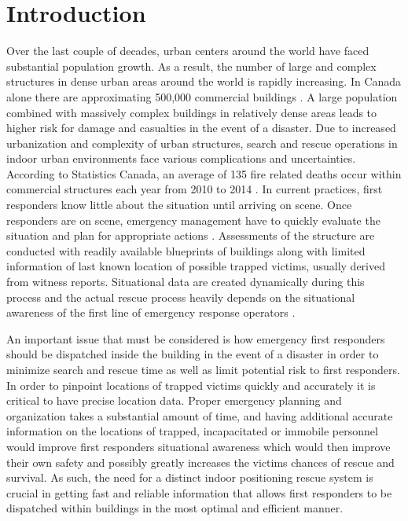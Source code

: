

\setcounter{section}{0}
\section{Introduction}
\bigskip
Over the last couple of decades, urban centers around the world have faced substantial population growth. As a result, the number of large and complex structures in dense urban areas around the world is rapidly increasing. In Canada alone there are approximating 500,000 commercial buildings \cite{R1-1}. A large population combined with massively complex buildings in relatively dense areas leads to higher risk for damage and casualties in the event of a disaster. Due to increased urbanization and complexity of urban structures, search and rescue operations in indoor urban environments face various complications and uncertainties. According to Statistics Canada, an average of 135 fire related deaths occur within commercial structures each year from 2010 to 2014 \cite{R1-2}. In current practices, first responders know little about the situation until arriving on scene. Once responders are on scene, emergency management have to quickly evaluate the situation and plan for appropriate actions \cite{R1-3}.  Assessments of the structure are conducted with readily available blueprints of buildings along with limited information of last known location of possible trapped victims, usually derived from witness reports. Situational data are created dynamically during this process and the actual rescue process heavily depends on the situational awareness of the first line of emergency response operators \cite{R1-4}.

\bigskip
An important issue that must be considered is how emergency first responders should be dispatched inside the building in the event of a disaster in order to minimize search and rescue time as well as limit potential risk to first responders. In order to pinpoint locations of trapped victims quickly and accurately it is critical to have precise location data. Proper emergency planning and organization takes a substantial amount of time, and having additional accurate information on the locations of trapped, incapacitated or immobile personnel would improve first responders situational awareness which would then improve their own safety and possibly greatly increases the victims chances of rescue and survival. As such, the need for a distinct indoor positioning rescue system is crucial in getting fast and reliable information that allows first responders to be dispatched within buildings in the most optimal and efficient manner. 


